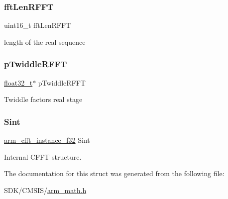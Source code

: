 \subsubsection{\texorpdfstring{fft\+Len\+R\+F\+FT}{fftLenRFFT}}
{\footnotesize\ttfamily uint16\+\_\+t fft\+Len\+R\+F\+FT}

length of the real sequence \mbox{\label{structarm__rfft__fast__instance__f32_a43370fe848d06993faf834da07ca91ce}} 
\subsubsection{\texorpdfstring{p\+Twiddle\+R\+F\+FT}{pTwiddleRFFT}}
{\footnotesize\ttfamily \mbox{\hyperlink{arm__math_8h_a4611b605e45ab401f02cab15c5e38715}{float32\+\_\+t}}$\ast$ p\+Twiddle\+R\+F\+FT}

Twiddle factors real stage \mbox{\label{structarm__rfft__fast__instance__f32_aa8a05a9fabc3852e5d476152a5067e53}} 
\subsubsection{\texorpdfstring{Sint}{Sint}}
{\footnotesize\ttfamily \mbox{\hyperlink{structarm__cfft__instance__f32}{arm\+\_\+cfft\+\_\+instance\+\_\+f32}} Sint}

Internal C\+F\+FT structure. 

The documentation for this struct was generated from the following file\+:\begin{DoxyCompactItemize}
\item 
S\+D\+K/\+C\+M\+S\+I\+S/\mbox{\hyperlink{arm__math_8h}{arm\+\_\+math.\+h}}\end{DoxyCompactItemize}
